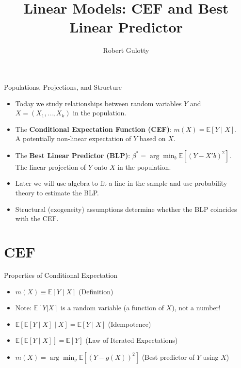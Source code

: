 \documentclass[aspectratio=169]{beamer}
\title[PLSC 30700]{Linear Models: CEF and Best Linear Predictor}
\author{Robert Gulotty}
\institute[Chicago]{University of Chicago}
\numberwithin{equation}{section}
\begin{document}
\begin{frame}
\maketitle
\end{frame}


\begin{frame}{Populations, Projections, and Structure}
\begin{itemize}
\item Today we study relationships between random variables 
      $Y$ and $X = (X_1, \ldots, X_k)$ in the population.

\item The \textbf{Conditional Expectation Function (CEF)}:
      $m(X) = \mathbb{E}[Y \mid X]$.
      \\ \quad A potentially non-linear expectation of $Y$ based on $X$.

\item The \textbf{Best Linear Predictor (BLP)}:
      $\beta^* = \arg\min_b \mathbb{E}[(Y - X'b)^2]$.
      \\ \quad The linear projection of $Y$ onto $X$ in the population.

\item Later we will use algebra to fit a line in the sample and use probability theory to estimate the BLP.

\item Structural (exogeneity) assumptions determine whether the BLP coincides with the CEF.
\end{itemize}
\end{frame}




\section{CEF}

\begin{frame}{Properties of Conditional Expectation}
\begin{itemize}
  \item $m(X) \equiv \mathbb{E}[Y \mid X]$ \hfill (Definition)
  \item[*] Note: $\mathbb{E}[Y|X]$ is a random variable (a function of $X$), not a number!
  \bigskip
  \item $\mathbb{E}[\mathbb{E}[Y \mid X] \mid X] = \mathbb{E}[Y \mid X]$ \hfill (Idempotence)
  \bigskip
  \item $\mathbb{E}[\mathbb{E}[Y \mid X]] = \mathbb{E}[Y]$ \hfill (Law of Iterated Expectations)
  \bigskip
  \item $m(X) = \arg\min_{g} \mathbb{E}[(Y - g(X))^2]$ \hfill (Best predictor of $Y$ using $X$)

\end{itemize}
\end{frame}
\end{document}
